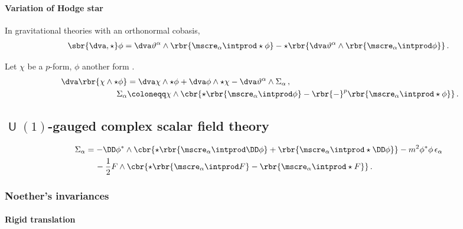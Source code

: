 \documentclass[a4paper]{article}
\begin{document}
\paragraph{Variation of Hodge star}
In gravitational theories \cite[sec.\ 3.2]{Muench1998} with an orthonormal 
cobasis,
\begin{align}
\sbr{\dva, \star}\phi = 
\dva\vartheta^{\alpha}\wedge\rbr{\mscre_{\alpha}\intprod\star\phi} -
\star\rbr{\dva\vartheta^{\alpha}\wedge\rbr{\mscre_{\alpha}\intprod\phi}}\,.
\end{align}

Let $\chi$ be a $p$-form, $\phi$ another form \cite[sec.\ 5]{Itin1999}.
\begin{align}\
\dva\rbr{\chi\wedge\star\phi} &=
\dva \chi \wedge \star \phi + \dva \phi \wedge \star \chi -
	\dva \vartheta^{\alpha} \wedge \Sigma_{\alpha}\,,
\\
\Sigma_{\alpha} &\coloneqq \chi \wedge \cbr{
	\star\rbr{\mscre_{\alpha}\intprod\phi} -
	\rbr{-}^{p} \rbr{\mscre_{\alpha}\intprod\star\phi}}\,.
\end{align}

\subsection[$U(1)$-gauged complex scalar field theory]%
{$\msansU(1)$-gauged complex scalar field theory}


\begin{align}
\begin{split}
\Sigma_{\alpha} &=
	-\DD\phi^* \wedge \cbr{\star\rbr{\mscre_{\alpha}\intprod \DD\phi} +
		\rbr{\mscre_{\alpha}\intprod\star\DD\phi}}
-m^2\phi^*\phi\,\epsilon_{\alpha}
\\
&\quad\,
- \frac{1}{2} F \wedge \cbr{\star\rbr{\mscre_{\alpha}\intprod F} -
		\rbr{\mscre_{\alpha}\intprod \star F}}\,.
\end{split}
\end{align}

\subsubsection{Noether's invariances}
\cite{Avery2015}

\paragraph{Rigid translation}

%


\printbibliography
\end{document}
